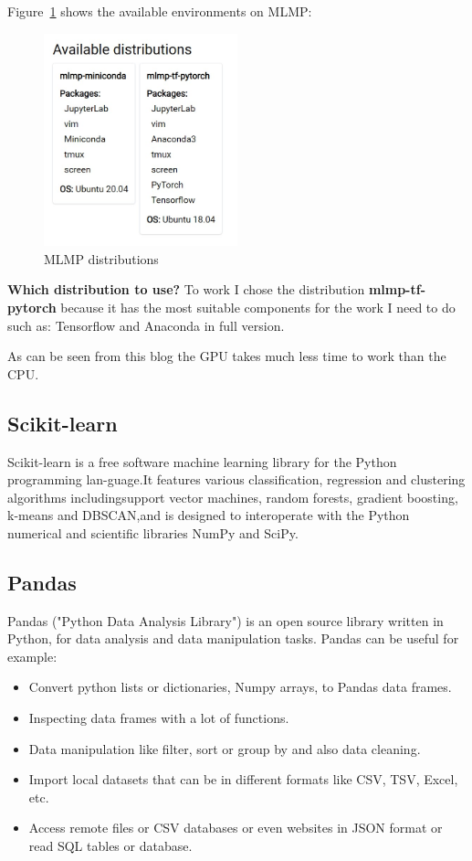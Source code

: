 Figure~\ref{fig:fig_02} shows the available environments on MLMP:
\begin{figure}[ht!]
\centering
\includegraphics[width=0.5\textwidth]{images/bfhmlmp.jpg}
\caption{MLMP distributions}
\label{fig:fig_02}
\end{figure}
\FloatBarrier
\textbf{Which distribution to use?}
To work I chose the distribution \textbf{mlmp-tf-pytorch} because it has the most suitable components for the work I need to do such as: Tensorflow and Anaconda in full version.

As can be seen from this blog \cite{giphy_blown_nodate} the GPU takes much less time to work than the CPU.

\subsection{Scikit-learn}
Scikit-learn \cite{noauthor_scikit-learn_nodate} is  a  free  software  machine  learning  library  for  the  Python  programming  lan-guage.It features various classification, regression and clustering algorithms includingsupport vector machines, random forests, gradient boosting, k-means and DBSCAN,and  is  designed  to  interoperate  with  the  Python  numerical  and  scientific  libraries NumPy and SciPy.

\subsection{Pandas}
Pandas \cite{noauthor_pandas_nodate} ("Python Data Analysis Library") is an open source library written in Python, for data analysis and data manipulation tasks.
Pandas can be useful for example:
\begin{itemize}
    \item Convert python lists or dictionaries, Numpy arrays, to Pandas data frames.
    \item Inspecting data frames with a lot of functions.
    \item Data manipulation like filter, sort or group by and also data cleaning.
    \item Import local datasets that can be in different formats like CSV, TSV, Excel, etc.
    \item Access remote files or CSV databases or even websites in JSON format or read SQL tables or database.
\end{itemize}

